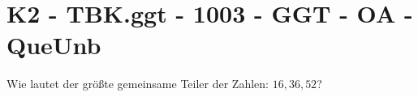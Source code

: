 \section{K2 - TBK.ggt - 1003 - GGT - OA - QueUnb}

\begin{beispiel}{1} %
				Wie lautet der größte gemeinsame Teiler der Zahlen: $16,36,52$?\leer
				
\end{beispiel}